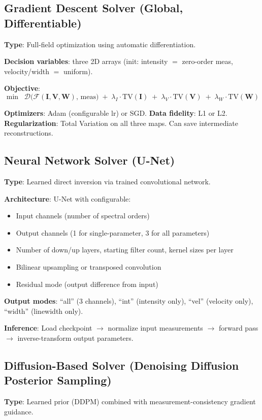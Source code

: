 \documentclass[11pt,a4paper]{article}
\begin{document}
\subsection{Gradient Descent Solver (Global, Differentiable)}
\textbf{Type}: Full-field optimization using automatic differentiation.

\textbf{Decision variables}: three 2D arrays (init: intensity $=$ zero-order meas, velocity/width $=$ uniform).

\textbf{Objective}:
\[
\min \;\; \mathcal{D}\big(\mathcal{F}(\mathbf{I},\mathbf{V},\mathbf{W}),\, \text{meas}\big) \;+\; \lambda_I \cdot \text{TV}(\mathbf{I}) \;+\; \lambda_V \cdot \text{TV}(\mathbf{V}) \;+\; \lambda_W \cdot \text{TV}(\mathbf{W})
\]

\textbf{Optimizers}: Adam (configurable lr) or SGD. \textbf{Data fidelity}: L1 or L2. \textbf{Regularization}: Total Variation on all three maps. Can save intermediate reconstructions.

\subsection{Neural Network Solver (U-Net)}
\textbf{Type}: Learned direct inversion via trained convolutional network.

\textbf{Architecture}: U-Net with configurable:
\begin{itemize}[nosep]
  \item Input channels (number of spectral orders)
  \item Output channels (1 for single-parameter, 3 for all parameters)
  \item Number of down/up layers, starting filter count, kernel sizes per layer
  \item Bilinear upsampling or transposed convolution
  \item Residual mode (output difference from input)
\end{itemize}

\textbf{Output modes}: ``all'' (3 channels), ``int'' (intensity only), ``vel'' (velocity only), ``width'' (linewidth only).

\textbf{Inference}: Load checkpoint $\rightarrow$ normalize input measurements $\rightarrow$ forward pass $\rightarrow$ inverse-transform output parameters.

\subsection{Diffusion-Based Solver (Denoising Diffusion Posterior Sampling)}
\textbf{Type}: Learned prior (DDPM) combined with measurement-consistency gradient guidance.
\end{document}
